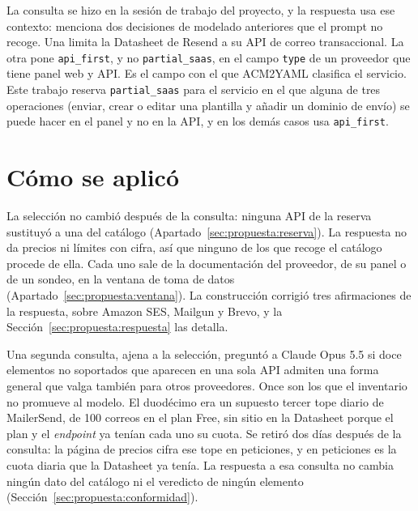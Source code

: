 La consulta se hizo en la sesión de trabajo del proyecto, y la respuesta usa ese contexto: menciona dos decisiones de modelado anteriores que el prompt no recoge.
Una limita la Datasheet de Resend a su API de correo transaccional.
La otra pone \texttt{api\_first}, y no \texttt{partial\_saas}, en el campo \texttt{type} de un proveedor que tiene panel web y API.
Es el campo con el que ACM2YAML clasifica el servicio.
Este trabajo reserva \texttt{partial\_saas} para el servicio en el que alguna de tres operaciones (enviar, crear o editar una plantilla y añadir un dominio de envío) se puede hacer en el panel y no en la API, y en los demás casos usa \texttt{api\_first}.

\section{Cómo se aplicó}

La selección no cambió después de la consulta: ninguna API de la reserva sustituyó a una del catálogo (Apartado~\ref{sec:propuesta:reserva}).
La respuesta no da precios ni límites con cifra, así que ninguno de los que recoge el catálogo procede de ella.
Cada uno sale de la documentación del proveedor, de su panel o de un sondeo, en la ventana de toma de datos (Apartado~\ref{sec:propuesta:ventana}).
La construcción corrigió tres afirmaciones de la respuesta, sobre Amazon SES, Mailgun y Brevo, y la Sección~\ref{sec:propuesta:respuesta} las detalla.

Una segunda consulta, ajena a la selección, preguntó a Claude Opus 5.5 si doce elementos no soportados que aparecen en una sola API admiten una forma general que valga también para otros proveedores.
Once son los que el inventario no promueve al modelo.
El duodécimo era un supuesto tercer tope diario de MailerSend, de 100 correos en el plan Free, sin sitio en la Datasheet porque el plan y el \textit{endpoint} ya tenían cada uno su cuota.
Se retiró dos días después de la consulta: la página de precios cifra ese tope en peticiones, y en peticiones es la cuota diaria que la Datasheet ya tenía.
La respuesta a esa consulta no cambia ningún dato del catálogo ni el veredicto de ningún elemento (Sección~\ref{sec:propuesta:conformidad}).

